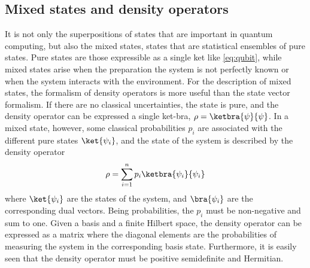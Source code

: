 \subsection{Mixed states and density operators}
It is not only the superpositions of states that are important in quantum computing, but also the mixed states, states that are statistical ensembles of pure states.
Pure states are those expressible as a single ket like \cref{eq:qubit}, while mixed states arise when the preparation the system is not perfectly known or when the system interacts with the environment.
For the description of mixed states, the formalism of density operators is more useful than the state vector formalism.
If there are no classical uncertainties, the state is pure, and the density operator can be expressed a single ket-bra, $\rho = \ketbra{\psi}{\psi}$.
In a mixed state, however, some classical probabilities $p_i$ are associated with the different pure states $\ket{\psi_i}$, and the state of the system is described by the density operator
\begin{equation}
    \rho = \sum_{i=1}^n p_i \ketbra{\psi_i}{\psi_i}
    \label{eq:density}
\end{equation}
where $\ket{\psi_i}$ are the states of the system, and $\bra{\psi_i}$ are the corresponding dual vectors.
Being probabilities, the $p_i$ must be non-negative and sum to one.
Given a basis and a finite Hilbert space, the density operator can be expressed as a matrix where the diagonal elements are the probabilities of measuring the system in the corresponding basis state.
Furthermore, it is easily seen that the density operator must be positive semidefinite and Hermitian.

